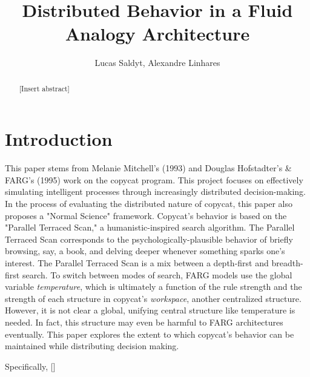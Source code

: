 \documentclass[a4paper]{article}
\title{Distributed Behavior in a Fluid Analogy Architecture}
\author{Lucas Saldyt, Alexandre Linhares}
\begin{document}
\maketitle

\begin{abstract}
    [Insert abstract]
\end{abstract}


\section{Introduction}

    This paper stems from Melanie Mitchell's (1993) and Douglas Hofstadter's \& FARG's (1995) work on the copycat program. 
    This project focuses on effectively simulating intelligent processes through increasingly distributed decision-making.
    In the process of evaluating the distributed nature of copycat, this paper also proposes a "Normal Science" framework. 
    Copycat's behavior is based on the "Parallel Terraced Scan," a humanistic-inspired search algorithm.
The Parallel Terraced Scan corresponds to the psychologically-plausible behavior of briefly browsing, say, a book, and delving deeper whenever something sparks one's interest. 
The Parallel Terraced Scan is a mix between a depth-first and breadth-first search.
To switch between modes of search, FARG models use the global variable \emph{temperature}, which is ultimately a function of the rule strength and the strength of each structure in copycat's \emph{workspace}, another centralized structure.
However, it is not clear a global, unifying central structure like temperature is needed.
In fact, this structure may even be harmful to FARG architectures eventually.
This paper explores the extent to which copycat's behavior can be maintained while distributing decision making.

    Specifically, []
\end{document}
